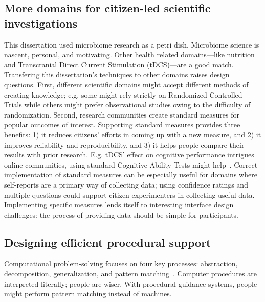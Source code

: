 \subsection{More domains for citizen-led scientific investigations}
This dissertation used microbiome research as a petri dish. Microbiome science is nascent, personal, and motivating. Other health related domains---like nutrition and Transcranial Direct Current Stimulation (tDCS)---are a good match. Transfering this dissertation's techniques to other domains raises design questions. First, different scientific domains might accept different methods of creating knowledge; e.g. some might rely strictly on Randomized Controlled Trials while others might prefer observational studies owing to the difficulty of randomization. Second, research communities create standard measures for popular outcomes of interest. Supporting standard measures provides three benefits: 1) it reduces citizens' efforts in coming up with a new measure, and 2) it improves reliability and reproducibility, and 3) it helps people compare their results with prior research. E.g. tDCS' effect on cognitive performance intrigues online communities, using standard Cognitive Ability Tests might help~\cite{macan1994effects}.  Correct implementation of standard measures can be especially useful for domains where self-reports are a primary way of collecting data; using confidence ratings and multiple questions could support citizen experimenters in collecting useful data. Implementing specific measures lends itself to interesting interface design challenges: the process of providing data should be simple for participants.

\subsection{Designing efficient procedural support}
Computational problem-solving focuses on four key processes: abstraction, decomposition, generalization, and pattern matching~\cite{Wing2006}. Computer procedures are interpreted literally; people are wiser. With procedural guidance systems, people might perform pattern matching instead of machines.

